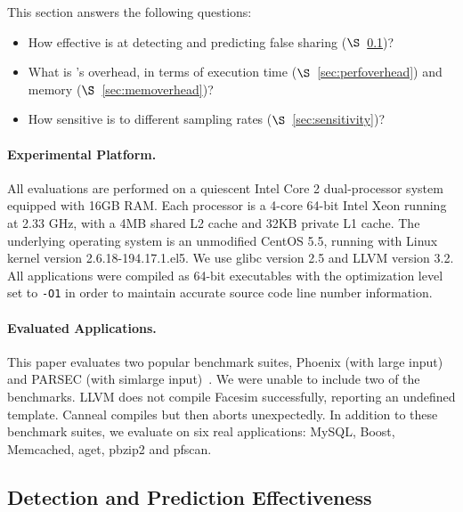 \label{sec:evaluation}

This section answers the following questions:
\begin{itemize}
\item
  How effective is \Predator{} at detecting and predicting false sharing ($\S$~\ref{sec:effective})?

\item
  What is \Predator{}'s overhead, in terms of execution time ($\S$~\ref{sec:perfoverhead}) and memory ($\S$~\ref{sec:memoverhead})?

\item 
  How sensitive is \Predator{} to different sampling rates ($\S$~\ref{sec:sensitivity})? 
 
\end{itemize}

\paragraph{Experimental Platform.} All evaluations are performed on a quiescent Intel Core 2 dual-processor system equipped with 
16GB RAM. Each processor is a 4-core 64-bit Intel Xeon running at 2.33 GHz, with a 4MB shared L2 cache and 32KB private L1 cache. The underlying operating system is an unmodified CentOS 5.5, running with Linux kernel version 2.6.18-194.17.1.el5. We use glibc version 2.5 and LLVM version 3.2. 
All applications were compiled as 64-bit executables with the optimization level set to \texttt{-O1} in order to maintain accurate source code line number information.

\paragraph{Evaluated Applications.} 
This paper evaluates two popular benchmark suites,
Phoenix (with large input)~\cite{phoenix-hpca} and PARSEC (with simlarge input)~\cite{parsec}. We were unable to include two of the benchmarks. LLVM does not compile Facesim successfully, reporting an undefined template. Canneal compiles but then aborts unexpectedly. In addition to these benchmark suites, 
we evaluate \Predator{} on six real applications: MySQL, Boost, Memcached, aget, pbzip2 and pfscan.


\subsection{Detection and Prediction Effectiveness}
\label{sec:effective}

